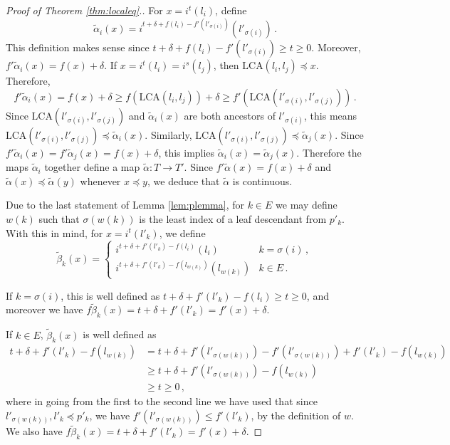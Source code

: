 \documentclass[10pt,a4paper]{amsart}
\newcommand{\LCA}{\mathrm{LCA}}
\begin{document}
\begin{proof}[Proof of Theorem \ref{thm:localeq}.] For $x = i^t(l_i)$, define
\begin{equation*}
    \widetilde{\alpha}_i(x) = i^{t + \delta +  f(l_i) - f'(l'_{\sigma(i)})}(l'_{\sigma(i)})\,.
\end{equation*}
This definition makes sense since $t + \delta +  f(l_i) - f'(l'_{\sigma(i)}) \geq t \geq 0$. Moreover, $f'\widetilde{\alpha}_i(x) = f(x) + \delta$.
If $x = i^t(l_i) = i^s(l_j)$, then $\LCA(l_i,l_j) \preceq x$. Therefore,
\begin{equation*}
    f'\widetilde{\alpha}_i(x) = f(x) + \delta \geq f(\LCA(l_i,l_j)) + \delta \geq f'(\LCA(l'_{\sigma(i)}, l'_{\sigma(j)}))\,.
\end{equation*}
Since $\LCA(l'_{\sigma(i)}, l'_{\sigma(j)})$ and $\widetilde{\alpha}_i(x)$ are both ancestors of $l'_{\sigma(i)}$, this means $\LCA(l'_{\sigma(i)}, l'_{\sigma(j)}) \preceq \widetilde{\alpha}_i(x)$. Similarly, $\LCA(l'_{\sigma(i)}, l'_{\sigma(j)}) \preceq \widetilde{\alpha}_j(x)$. Since $f'\widetilde{\alpha}_i(x) = f'\widetilde{\alpha}_j(x) = f(x) + \delta$, this implies $\widetilde{\alpha}_i(x) = \widetilde{\alpha}_j(x)$. Therefore the maps $\widetilde{\alpha}_i$ together define a map $\widetilde{\alpha}: T \to T'$. Since $f'\widetilde\alpha(x) = f(x) + \delta$ and $\widetilde\alpha(x) \preceq \widetilde\alpha(y)$ whenever $x \preceq y$, we deduce that $\widetilde\alpha$ is continuous.

Due to the last statement of Lemma \ref{lem:plemma}, for $k \in E$ we may define $w(k)$ such that $\sigma(w(k))$ is the least index of a leaf descendant from $p'_k$. With this in mind, for $x = i^t(l'_k)$, we define
\begin{equation*}
    \widetilde{\beta}_k(x) = \begin{cases}
        i^{t + \delta + f'(l'_k) - f(l_i)}(l_i)& k = \sigma(i)\,,\\
        i^{t + \delta + f'(l'_k) - f(l_{w(k)})}(l_{w(k)})& k \in E\,.
    \end{cases}
\end{equation*}

If $k = \sigma(i)$, this is well defined as $t + \delta + f'(l'_k) - f(l_i) \geq t \geq 0$, and moreover we have $f\widetilde{\beta}_k(x) = t + \delta + f'(l'_k) = f'(x) + \delta$.

If $k \in E$, $\widetilde\beta_k(x)$ is well defined as
\begin{align*}
    t + \delta + f'(l'_k) - f(l_{w(k)}) &= t + \delta + f'(l'_{\sigma(w(k))}) - f'(l'_{\sigma(w(k))}) + f'(l'_k) - f(l_{w(k)})\\
    &\geq t + \delta + f'(l'_{\sigma(w(k))}) - f(l_{w(k)})\\
    &\geq t \geq 0\,,
\end{align*}
where in going from the first to the second line we have used that since $l'_{\sigma(w(k))}, l'_k\preceq p'_k$, we have $f'(l'_{\sigma(w(k))}) \leq f'(l'_k)$, by the definition of $w$. We also have $f\widetilde\beta_k(x) = t + \delta + f'(l'_{k}) = f'(x) + \delta$.


\end{proof}
\end{document}
